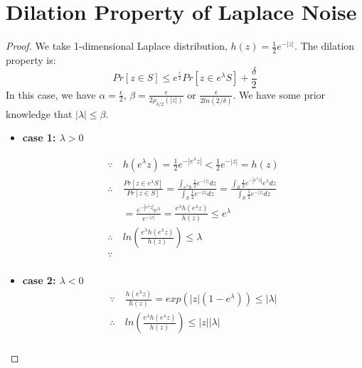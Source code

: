 \documentclass{article}
\begin{document}
\section{Dilation Property of Laplace Noise}
\label{sec_Dila}
\begin{proof}
We take 1-dimensional Laplace distribution, $h(z) = \frac{1}{2} e^{-|z|}$.
The dilation property is:
\begin{equation*}
Pr[z \in S] \leq e^{\frac{\epsilon}{2}} Pr[z \in e^{\lambda} S] + \frac{\delta}{2}
\end{equation*}
In this case, we have $\alpha = \frac{\epsilon}{2}$, $\beta = \frac{\epsilon}{2 \rho_{\delta/2}(|z|)}$ or $ \frac{\epsilon}{2 ln(2/\delta)}$. We have some prior knowledge that $|\lambda| \leq \beta$.

\begin{itemize}
	\item \textbf{case 1: $\lambda > 0$}

	\begin{equation*}
	\begin{split}
	\because\ 		& 	h(e^{\lambda} z) =  \frac{1}{2} e^{-|e^{\lambda} z|} < \frac{1}{2} e^{-|z|} = h(z)\\
	\therefore\		& 	\frac{Pr[z \in e^{\lambda} S]}{Pr[z \in S]} 
						= \frac
						{\int_{e^{\lambda} S}{} \frac{1}{2}e^{-|z|} dz}
						{\int_{S}{} \frac{1}{2}e^{-|z|} dz} 
						= \frac
						{\int_{S}{} \frac{1}{2}e^{-|e^{\lambda}z|} e^{\lambda} dz}
						{\int_{S}{} \frac{1}{2}e^{-|z|}dz} \\
					&	= \frac{e^{-|e^{\lambda}z|} e^{\lambda}}{e^{-|z|}}
						= \frac{e^{\lambda} h(e^{\lambda} z)}{h(z)}
						\leq e^{\lambda}\\
	\therefore\		&	ln(\frac{e^{\lambda} h(e^{\lambda} z)}{h(z)})
						\leq \lambda \\
	\because\		&	\\
	\end{split}
	\end{equation*}

	\item \textbf{case 2: $\lambda < 0$}
	\begin{equation*}
	\begin{split}
	\because\	& \frac{h(e^{\lambda} z)}{h(z)} = exp(|z|(1 - e^{\lambda})) \leq |\lambda|\\
	\therefore\	& ln(\frac{e^{\lambda} h(e^{\lambda} z)}{h(z)}) \leq |z||\lambda|\\
	\end{split}
	\end{equation*}

\end{itemize}

\end{proof} 




\end{document}

